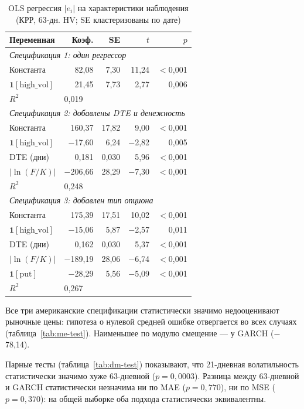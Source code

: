 \documentclass[11pt,a4paper]{article}
\begin{document}
\begin{table}[H]
\centering
\caption{OLS регрессия $|e_i|$ на характеристики наблюдения (КРР, 63-дн. HV; SE кластеризованы по дате)}
\label{tab:ols-reg}
\small
\begin{tabular}{lrrrr}
\toprule
Переменная & Коэф. & SE & $t$ & $p$ \\
\midrule
\multicolumn{5}{l}{\textit{Спецификация 1: один регрессор}} \\
Константа                   & 82,08 & 7,30 &  11,24 & $<$0,001 \\
$\mathbf{1}[\text{high\_vol}]$ & 21,45 & 7,73 &   2,77 & 0,006    \\
$R^2$ & \multicolumn{4}{l}{0,019} \\
\midrule
\multicolumn{5}{l}{\textit{Спецификация 2: добавлены DTE и денежность}} \\
Константа                   & 160,37 & 17,82 &  9,00 & $<$0,001 \\
$\mathbf{1}[\text{high\_vol}]$ & $-$17,60 & 6,24 & $-$2,82 & 0,005 \\
DTE (дни)                   &    0,181 & 0,030 &   5,96 & $<$0,001 \\
$|\ln(F/K)|$                & $-$206,66 & 28,29 & $-$7,30 & $<$0,001 \\
$R^2$ & \multicolumn{4}{l}{0,248} \\
\midrule
\multicolumn{5}{l}{\textit{Спецификация 3: добавлен тип опциона}} \\
Константа                   & 175,39 & 17,51 &  10,02 & $<$0,001 \\
$\mathbf{1}[\text{high\_vol}]$ & $-$15,06 & 5,87 & $-$2,57 & 0,011 \\
DTE (дни)                   &    0,162 & 0,030 &   5,37 & $<$0,001 \\
$|\ln(F/K)|$                & $-$189,19 & 28,06 & $-$6,74 & $<$0,001 \\
$\mathbf{1}[\text{put}]$    &  $-$28,29 & 5,56  & $-$5,09 & $<$0,001 \\
$R^2$ & \multicolumn{4}{l}{0,267} \\
\bottomrule
\end{tabular}
\end{table}

Все три американские спецификации статистически значимо недооценивают рыночные цены: гипотеза о нулевой средней ошибке отвергается во всех случаях (таблица~\ref{tab:me-test}). Наименьшее по модулю смещение --- у GARCH ($-$78,14).

Парные тесты (таблица~\ref{tab:dm-test}) показывают, что 21-дневная волатильность статистически значимо хуже 63-дневной ($p = 0{,}0003$). Разница между 63-дневной и GARCH статистически незначима ни по MAE ($p = 0{,}770$), ни по MSE ($p = 0{,}370$): на общей выборке оба подхода статистически эквивалентны.
\end{document}
